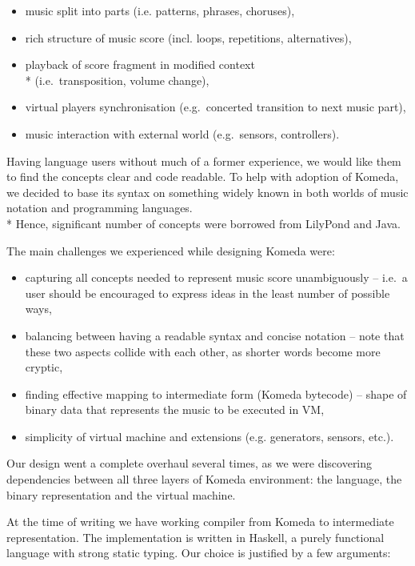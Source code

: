 \documentclass{article}
\begin{document}
\begin{itemize}
  \item music split into parts (i.e. patterns, phrases, choruses),
  \item rich structure of music score (incl. loops, repetitions, alternatives),
  \item playback of score fragment in modified context \\*
    (i.e.~transposition, volume change),
  \item virtual players synchronisation (e.g.~concerted transition to next
    music part), 
  \item music interaction with external world (e.g.~sensors, controllers).
\end{itemize}

Having language users without much of a former experience, we would like them
to find the concepts clear and code readable. To help with adoption of Komeda,
we decided to base its syntax on something widely known in both worlds of music
notation and programming languages. \\* Hence, significant number of
concepts were borrowed from LilyPond \cite{lily} and Java. 

The main challenges we experienced while designing Komeda were:
\begin{itemize}
  \item capturing all concepts needed to represent music score unambiguously --
    i.e.~a user should be encouraged to express ideas in the least number of
    possible ways,
  \item balancing between having a readable syntax and concise notation -- note
    that these two aspects collide with each other, as shorter words become
    more cryptic,
  \item finding effective mapping to intermediate form (Komeda bytecode) --
    shape of binary data that represents the music to be executed in VM,
  \item simplicity of virtual machine and extensions (e.g. generators, sensors,
    etc.).
\end{itemize}

Our design went a complete overhaul several times, as we were discovering
dependencies between all three layers of Komeda environment: the language, the
binary representation and the virtual machine.

At the time of writing we have working compiler from Komeda to intermediate
representation. The implementation is written in Haskell, a purely functional
language with strong static typing. Our choice is justified by a few arguments:
\end{document}
